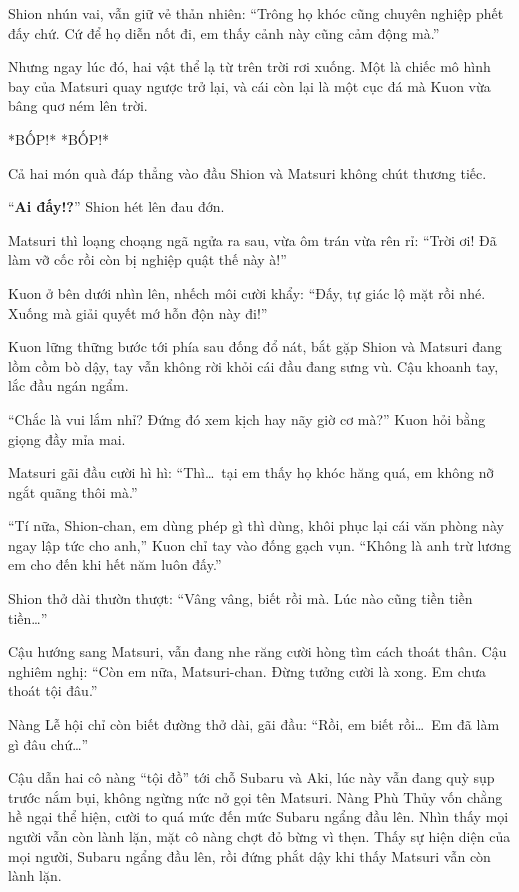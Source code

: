 \documentclass[../main.tex]{subfiles}
\begin{document}

Shion nhún vai, vẫn giữ vẻ thản nhiên: ``Trông họ khóc cũng chuyên nghiệp phết đấy chứ. Cứ để họ diễn nốt đi, em thấy cảnh này cũng cảm động mà.''

Nhưng ngay lúc đó, hai vật thể lạ từ trên trời rơi xuống. Một là chiếc mô hình bay của Matsuri quay ngược trở lại, và cái còn lại là một cục đá mà Kuon vừa bâng quơ ném lên trời.

*BỐP!* *BỐP!*

Cả hai món quà đáp thẳng vào đầu Shion và Matsuri không chút thương tiếc.


``\textbf{Ai đấy!?}'' Shion hét lên đau đớn.

Matsuri thì loạng choạng ngã ngửa ra sau, vừa ôm trán vừa rên rỉ: ``Trời ơi! Đã làm vỡ cốc rồi còn bị nghiệp quật thế này à!''

Kuon ở bên dưới nhìn lên, nhếch môi cười khẩy: ``Đấy, tự giác lộ mặt rồi nhé. Xuống mà giải quyết mớ hỗn độn này đi!''

\omk

Kuon lững thững bước tới phía sau đống đổ nát, bắt gặp Shion và Matsuri đang lồm cồm bò dậy, tay vẫn không rời khỏi cái đầu đang sưng vù. Cậu khoanh tay, lắc đầu ngán ngẩm.

``Chắc là vui lắm nhỉ? Đứng đó xem kịch hay nãy giờ cơ mà?'' Kuon hỏi bằng giọng đầy mỉa mai.

Matsuri gãi đầu cười hì hì: ``Thì\dots\ tại em thấy họ khóc hăng quá, em không nỡ ngắt quãng thôi mà.''

``Tí nữa, Shion-chan, em dùng phép gì thì dùng, khôi phục lại cái văn phòng này ngay lập tức cho anh,'' Kuon chỉ tay vào đống gạch vụn. ``Không là anh trừ lương em cho đến khi hết năm luôn đấy.''

Shion thở dài thườn thượt: ``Vâng vâng, biết rồi mà. Lúc nào cũng tiền tiền tiền\dots''

Cậu hướng sang Matsuri, vẫn đang nhe răng cười hòng tìm cách thoát thân. Cậu nghiêm nghị: ``Còn em nữa, Matsuri-chan. Đừng tưởng cười là xong. Em chưa thoát tội đâu.''

Nàng Lễ hội chỉ còn biết đường thở dài, gãi đầu: ``Rồi, em biết rồi\dots\ Em đã làm gì đâu chứ\dots''

Cậu dẫn hai cô nàng ``tội đồ'' tới chỗ Subaru và Aki, lúc này vẫn đang quỳ sụp trước nắm bụi, không ngừng nức nở gọi tên Matsuri. Nàng Phù Thủy vốn chằng hề ngại thể hiện, cười to quá mức đến mức Subaru ngẩng đầu lên. Nhìn thấy mọi người vẫn còn lành lặn, mặt cô nàng chợt đỏ bừng vì thẹn. Thấy sự hiện diện của mọi người, Subaru ngẩng đầu lên, rồi đứng phắt dậy khi thấy Matsuri vẫn còn lành lặn.
\end{document}
